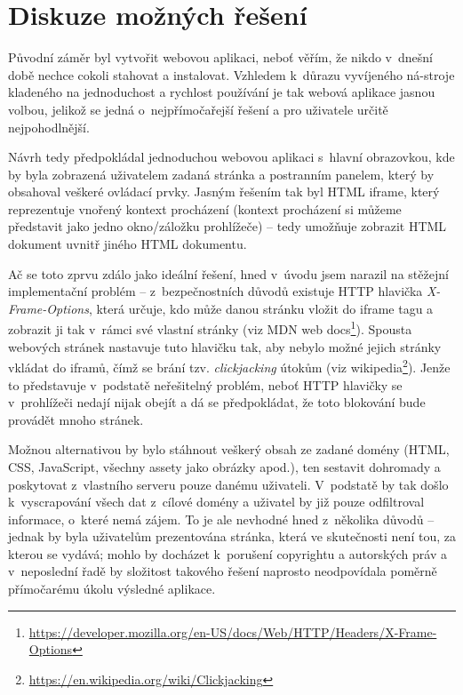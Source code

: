 \documentclass[thesis=B,czech]{FITthesis}[2012/06/26]
\begin{document}

\label{sec:possible_solutions}
\section{Diskuze možných řešení}
Původní záměr byl vytvořit webovou aplikaci, neboť věřím, že nikdo v~dnešní době nechce cokoli stahovat a instalovat. Vzhledem k~důrazu vyvíjeného ná-stroje kladeného na jednoduchost a rychlost používání je tak webová aplikace jasnou volbou, jelikož se jedná o~nejpřímočařejší řešení a pro uživatele určitě nejpohodlnější.

Návrh tedy předpokládal jednoduchou webovou aplikaci s~hlavní obrazovkou, kde by byla zobrazená uživatelem zadaná stránka a postranním panelem, který by obsahoval veškeré ovládací prvky. Jasným řešením tak byl HTML iframe, který reprezentuje vnořený kontext procházení (kontext procházení si můžeme představit jako jedno okno/záložku prohlížeče) -- tedy umožňuje zobrazit HTML dokument uvnitř jiného HTML dokumentu.

Ač se toto zprvu zdálo jako ideální řešení, hned v~úvodu jsem narazil na stěžejní implementační problém -- z~bezpečnostních důvodů existuje HTTP hlavička \emph{X-Frame-Options}, která určuje, kdo může danou stránku vložit do iframe tagu a zobrazit ji tak v~rámci své vlastní stránky (viz MDN web docs\footnote{\url{https://developer.mozilla.org/en-US/docs/Web/HTTP/Headers/X-Frame-Options}}). Spousta webových stránek nastavuje tuto hlavičku tak, aby nebylo možné jejich stránky vkládat do iframů, čímž se brání tzv. \emph{clickjacking} útokům (viz wikipedia\footnote{\url{https://en.wikipedia.org/wiki/Clickjacking}}). Jenže to představuje v~podstatě neřešitelný problém, neboť HTTP hlavičky se v~prohlížeči nedají nijak obejít a dá se předpokládat, že toto blokování bude provádět mnoho stránek.

Možnou alternativou by bylo stáhnout veškerý obsah ze zadané domény (HTML, CSS, JavaScript, všechny assety jako obrázky apod.), ten sestavit dohromady a poskytovat z~vlastního serveru pouze danému uživateli. V~podstatě by tak došlo k~vyscrapování všech dat z~cílové domény a uživatel by již pouze odfiltroval informace, o~které nemá zájem. To je ale nevhodné hned z~několika důvodů -- jednak by byla uživatelům prezentována stránka, která ve skutečnosti není tou, za kterou se vydává; mohlo by docházet k~porušení copyrightu a autorských práv a v~neposlední řadě by složitost takového řešení naprosto neodpovídala poměrně přímočarému úkolu výsledné aplikace.
\end{document}
